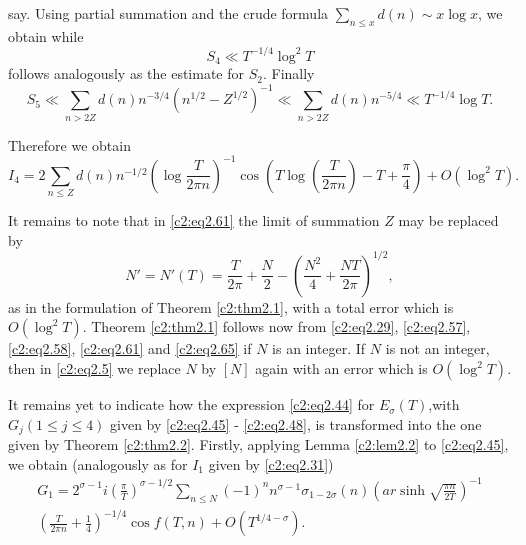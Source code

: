 say. Using partial summation and the crude formula
$\displaystyle{\sum_{n \leq x} d(n) \sim x \log x}$, we obtain
{}
while\pageoriginale
$$
S_4 \ll T^{-1/4} \log^2 T
$$
follows analogously as the estimate for $S_2$. Finally
$$
S_5 \ll \sum_{n > 2Z} d(n) n^{- 3/4} (n^{1/2}- Z^{1/2})^{-1} \ll
\sum_{n > 2Z} d(n) n^{- 5/4} \ll T^{- 1/4} \log T.
$$

Therefore we obtain
\begin{equation}
  I_4 = 2 \sum_{n \leq Z} d(n) n^{-1/2} \left(\log \frac{T}{2 \pi n}
  \right)^{-1} \cos \left(T \log \left(\frac{T}{2 \pi n}\right) - T +
  \frac{\pi}{4} \right)+ O (\log^2 T).\label{c2:eq2.65}
\end{equation}

It remains to note that in \eqref{c2:eq2.61} the limit of summation
$Z$ may be replaced by 
$$
N' = N' (T) = \frac{T}{2 \pi} + \frac{N}{2} - \left(\frac{N^2}{4} +
\frac{NT}{2 \pi} \right)^{1/2},
$$
as in the formulation of Theorem \ref{c2:thm2.1}, with a total error
which is\break $O (\log^2 T)$. Theorem \ref{c2:thm2.1} follows now from
\eqref{c2:eq2.29}, \eqref{c2:eq2.57}, \eqref{c2:eq2.58},
\eqref{c2:eq2.61} and \eqref{c2:eq2.65} if $N$ is an integer. If $N$
is not an integer, then in \eqref{c2:eq2.5} we replace $N$ by $[N]$
again with an error which is $O(\log^2T)$. 

It remains yet to indicate how the expression \eqref{c2:eq2.44} for
$E_\sigma (T)$,\pageoriginale with $G_j (1 \leq j\leq 4)$ given by
\eqref{c2:eq2.45} - \eqref{c2:eq2.48}, is transformed into the one
given by Theorem \ref{c2:thm2.2}. Firstly, applying Lemma
\ref{c2:lem2.2} to \eqref{c2:eq2.45}, we obtain (analogously as for
$I_1$ given by \eqref{c2:eq2.31})
\begin{multline*}
  G_1 = 2^{\sigma-1} i \left(\frac{\pi}{T} \right)^{\sigma- 1/2}
  \sum_{n \leq N} (-1)^n n^{\sigma-1} \sigma_{1- 2 \sigma} (n) \left(ar
  \sinh \sqrt{\frac{\pi n}{2 T}}\right)^{-1}\\ 
  \left(\frac{T}{2 \pi n} +
  \frac{1}{4}\right)^{-1/4} \cos f(T, n) + O(T^{1/4-\sigma}). 
\end{multline*}

